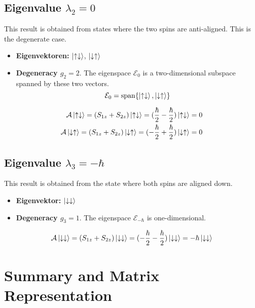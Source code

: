 \documentclass[11pt,a4paper]{article}
\begin{document}
\subsection{Eigenvalue $\lambda_2 = 0$}
This result is obtained from states where the two spins are anti-aligned. This is the degenerate case.
\begin{itemize}
    \item \textbf{Eigenvektoren:} $\ket{\uparrow\downarrow}$, $\ket{\downarrow\uparrow}$
    \item \textbf{Degeneracy $g_2=2$}. The eigenspace $\mathcal{E}_{0}$ is a two-dimensional subspace spanned by these two vectors.
    \begin{equation}
        \mathcal{E}_{0} = \text{span}\{\ket{\uparrow\downarrow}, \ket{\downarrow\uparrow}\}
    \end{equation}
\end{itemize}
\begin{align}
    \mathcal{A}\ket{\uparrow\downarrow} = (S_{1z} + S_{2z})\ket{\uparrow\downarrow} = (\frac{\hbar}{2} - \frac{\hbar}{2})\ket{\uparrow\downarrow} = 0 \\
    \mathcal{A}\ket{\downarrow\uparrow} = (S_{1z} + S_{2z})\ket{\downarrow\uparrow} = (-\frac{\hbar}{2} + \frac{\hbar}{2})\ket{\downarrow\uparrow} = 0
\end{align}

\subsection{Eigenvalue $\lambda_3 = -\hbar$}
This result is obtained from the state where both spins are aligned down.
\begin{itemize}
    \item \textbf{Eigenvektor:} $\ket{\downarrow\downarrow}$
    \item \textbf{Degeneracy $g_3=1$}. The eigenspace $\mathcal{E}_{-\hbar}$ is one-dimensional.
\end{itemize}
\begin{equation}
    \mathcal{A}\ket{\downarrow\downarrow} = (S_{1z} + S_{2z})\ket{\downarrow\downarrow} = (-\frac{\hbar}{2} - \frac{\hbar}{2})\ket{\downarrow\downarrow} = -\hbar\ket{\downarrow\downarrow}
\end{equation}

\section{Summary and Matrix Representation}
\end{document}
